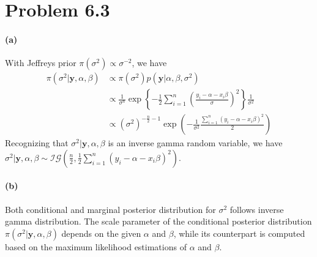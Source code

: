 \section{Problem 6.3}
\paragraph{(a)}
With Jeffreys prior $\pi(\sigma^2) \propto \sigma^{-2}$, we have
\begin{align*}
    \pi(\sigma^2 \vert \bm{y}, \alpha, \beta)
    &\propto \pi(\sigma^2) p(\bm{y} \vert \alpha, \beta, \sigma^2)\\
    &\propto \frac{1}{\sigma^n} \exp \left\{-\frac{1}{2} \sum_{i=1}^{n}\left( \frac{y_i - \alpha - x_i \beta }{\sigma} \right)^2 \right\} \frac{1}{\sigma^2}\\
    &\propto (\sigma^2)^{-\frac{n}{2}-1} \exp \left(
        -\frac{1}{\sigma^2} \frac{\sum_{i=1}^{n}\left( y_i - \alpha - x_i \beta \right)^2}{2}\right)
\end{align*}
Recognizing that $\sigma^2 \vert \bm{y}, \alpha, \beta$ is an inverse gamma random variable, we have $\sigma^2 \vert \bm{y}, \alpha, \beta \sim \mathcal{IG}\left ( \frac{n}{2}, \frac{1}{2}\sum_{i=1}^{n} \left( y_i - \alpha - x_i \beta \right)^2 \right)$.

\paragraph{(b)}
Both conditional and marginal posterior distribution for $\sigma^2$ follows inverse gamma distribution. The scale parameter of the conditional posterior distribution $\pi(\sigma^2 \vert \bm{y}, \alpha, \beta)$ depends on the given $\alpha$ and $\beta$, while its counterpart is computed based on the maximum likelihood estimations of $\alpha$ and $\beta$. 